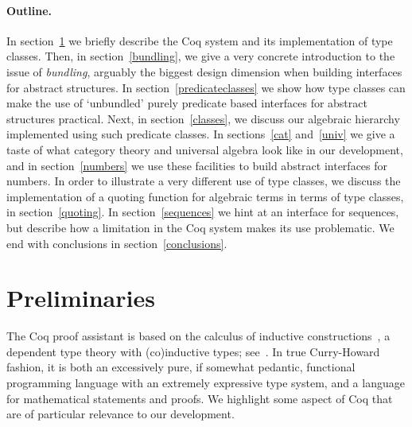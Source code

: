 \documentclass[a4paper,10pt,runningheads]{llncs}
\begin{document}
\paragraph{Outline.}
In section~\ref{preliminaries} we briefly describe the Coq system and its implementation of type classes. Then, in section~\ref{bundling}, we give a very concrete introduction to the issue of \emph{bundling}, arguably the biggest design dimension when building interfaces for abstract structures. In section~\ref{predicateclasses} we show how type classes can make the use of `unbundled' purely predicate based interfaces for abstract structures practical. Next, in section~\ref{classes}, we discuss our algebraic hierarchy implemented using such predicate classes. In sections~\ref{cat} and~\ref{univ} we give a taste of what category theory and universal algebra look like in our development, and in section~\ref{numbers} we use these facilities to build abstract interfaces for numbers. In order to illustrate a very different use of type classes, we discuss the implementation of a quoting function for algebraic terms in terms of type classes, in section~\ref{quoting}. In section~\ref{sequences} we hint at an interface for sequences, but describe how a limitation in the Coq system makes its use problematic. We end with conclusions in section~\ref{conclusions}.



\section{Preliminaries}
\label{preliminaries}


The Coq proof assistant is based on the calculus of inductive
constructions~\cite{CoquandHuet,CoquandPaulin}, a dependent type theory with (co)inductive types; see~\cite{Coq,BC04}. In true Curry-Howard fashion, it is both an excessively pure, if somewhat pedantic, functional programming language with an extremely expressive type system, and a language for mathematical statements and proofs. We highlight some aspect of Coq that are of particular relevance to our development.
\end{document}
